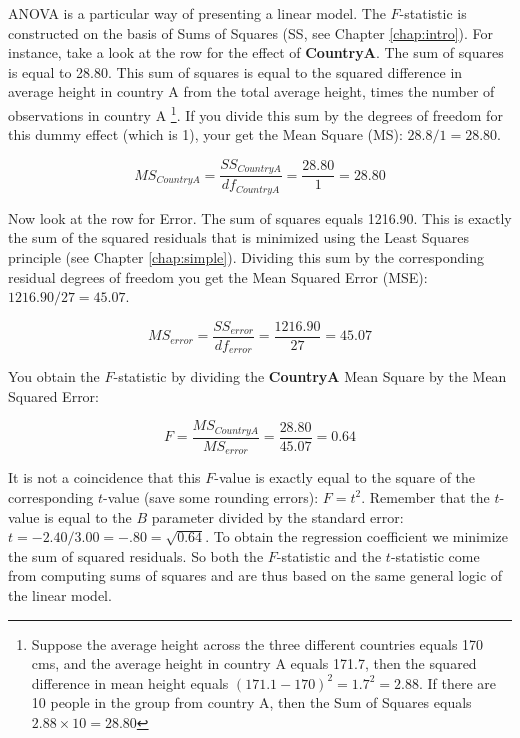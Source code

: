 \documentclass[]{book}\usepackage[]{graphicx}\usepackage[]{color}
\begin{document}
ANOVA is a particular way of presenting a linear model. The $F$-statistic is constructed on the basis of Sums of Squares (SS, see Chapter \ref{chap:intro}). For instance, take a look at the row for the effect of \textbf{CountryA}. The sum of squares is equal to 28.80. This sum of squares is equal to the squared difference in average height in country A from the total average height, times the number of observations in country A \footnote{Suppose the average height across the three different countries equals 170 cms, and the average height in country A equals 171.7, then the squared difference in mean height equals $(171.1-170)^2=1.7^2=2.88$. If there are 10 people in the group from country A, then the Sum of Squares equals $2.88\times 10=28.80$}. If you divide this sum by the degrees of freedom for this dummy effect (which is 1), your get the Mean Square (MS): $28.8/1=28.80$. 

\begin{equation}
MS_{CountryA}=\frac{SS_{CountryA}}{df_{CountryA}}=\frac{28.80}{1}=28.80 \label{eq:MSgroup}
\end{equation}

Now look at the row for Error. The sum of squares equals 1216.90. This is exactly the sum of the squared residuals that is minimized using the Least Squares principle (see Chapter \ref{chap:simple}). Dividing this sum by the corresponding residual degrees of freedom you get the Mean Squared Error (MSE): $1216.90/27=45.07$. 

\begin{equation}
MS_{error}=\frac{SS_{error}}{df_{error}}=\frac{1216.90}{27}=45.07  \label{eq:MSerror}
\end{equation}


You obtain the $F$-statistic by dividing the \textbf{CountryA} Mean Square by the Mean Squared Error: 


\begin{equation}
F=\frac{MS_{CountryA}}{MS_{error}}=\frac{28.80}{45.07}=0.64 \label{eq:F}
\end{equation}

It is not a coincidence that this $F$-value is exactly equal to the square of the corresponding $t$-value (save some rounding errors): $F=t^2$. Remember that the $t$-value is equal to the $B$ parameter divided by the standard error: $t=-2.40/3.00=-.80=\sqrt{0.64}$. To obtain the regression coefficient we minimize the sum of squared residuals. So both the $F$-statistic and the $t$-statistic come from computing sums of squares and are thus based on the same general logic of the linear model.\\
\end{document}
